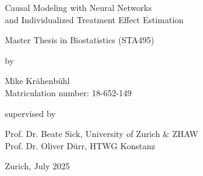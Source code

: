 \renewcommand\familydefault{\sfdefault} 


\thispagestyle{empty}
\renewcommand{\baselinestretch}{1.5}\normalfont
\begin{center}
\setlength{\parindent}{0cm}
\bf\Large%


Causal Modeling with Neural Networks \\
and Individualized Treatment Effect Estimation 



\normalfont



\hrulefill

\vspace*{4cm}

\large
Master Thesis in Biostatistics (STA495) %
\vspace*{12mm}

by

\vspace*{12mm}

Mike Kr{\"a}henb{\"u}hl\\
\small Matriculation number: 18-652-149\\
\normalfont
\vspace*{4cm}

supervised by

\vspace*{1cm}

Prof. Dr. Beate Sick, University of Zurich \& ZHAW \\
Prof. Dr. Oliver D{\"u}rr, HTWG Konstanz
\vfill

Zurich, July 2025
\end{center}
\renewcommand\familydefault{\rmdefault}%
\renewcommand{\baselinestretch}{1.0}\rm 
\setcounter{page}{0}
\newpage
\vspace*{12cm}~\thispagestyle{empty}
\newpage

